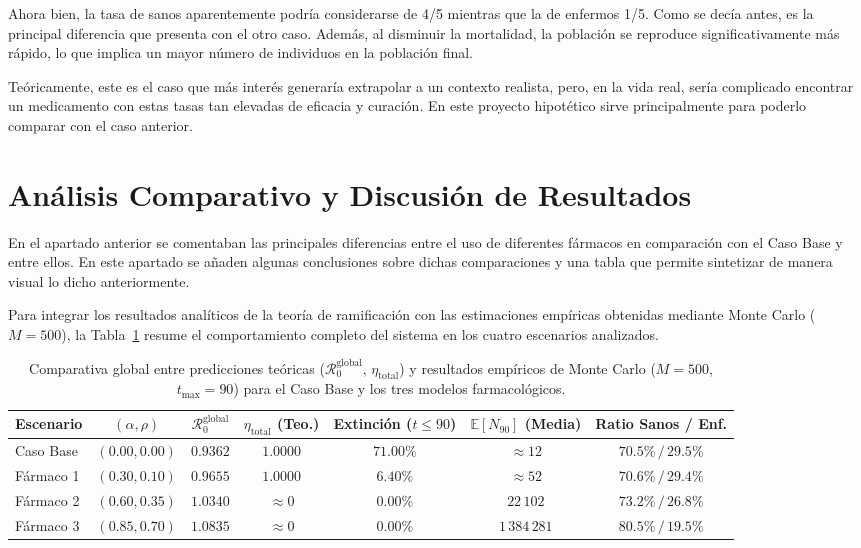 \documentclass[graybox]{SNmult}
\begin{document}
	Ahora bien, la tasa de sanos aparentemente podría considerarse de 4/5 mientras que la de enfermos 1/5. Como se decía antes, es la principal diferencia que presenta con el otro caso. Además, al disminuir la mortalidad, la población se reproduce significativamente más rápido, lo que implica un mayor número de individuos en la población final. 
	
	Teóricamente, este es el caso que más interés generaría extrapolar a un contexto realista, pero, en la vida real, sería complicado encontrar un medicamento con estas tasas tan elevadas de eficacia y curación. En este proyecto hipotético sirve principalmente para poderlo comparar con el caso anterior. 
	
	
	
	\section{Análisis Comparativo y Discusión de Resultados}
	\label{sec:discusion}
	En el apartado anterior se comentaban las principales diferencias entre el uso de diferentes fármacos en comparación con el Caso Base y entre ellos. En este apartado se añaden algunas conclusiones sobre dichas comparaciones y una tabla que permite sintetizar de manera visual lo dicho anteriormente. 
	
	
	Para integrar los resultados analíticos de la teoría de ramificación con las estimaciones empíricas obtenidas mediante Monte Carlo ($M=500$), la Tabla~\ref{tab:comparativa_global_final} resume el comportamiento completo del sistema en los cuatro escenarios analizados.
	
	\begin{table}[htbp]
		\caption{Comparativa global entre predicciones teóricas ($\mathcal{R}_0^{\text{global}}$, $\eta_{\text{total}}$) y resultados empíricos de Monte Carlo ($M=500$, $t_{\max}=90$) para el Caso Base y los tres modelos farmacológicos.}
		\label{tab:comparativa_global_final}
		\centering
		\begin{tabular}{lcccccc}
			\hline
			\textbf{Escenario} & $(\alpha, \rho)$ & $\mathcal{R}_0^{\text{global}}$ & $\eta_{\text{total}}$ \textbf{(Teo.)} & \textbf{Extinción ($t \le 90$)} & $\mathbb{E}[N_{90}]$ \textbf{(Media)} & \textbf{Ratio Sanos / Enf.} \\
			\hline
			Caso Base & $(0.00, 0.00)$ & $0.9362$ & $1.0000$ & $71.00\%$ & $\approx 12$ & $70.5\% \, / \, 29.5\%$ \\
			Fármaco 1 & $(0.30, 0.10)$ & $0.9655$ & $1.0000$ & $6.40\%$ & $\approx 52$ & $70.6\% \, / \, 29.4\%$ \\
			Fármaco 2 & $(0.60, 0.35)$ & $1.0340$ & $\approx 0$ & $0.00\%$ & $22\,102$ & $73.2\% \, / \, 26.8\%$ \\
			Fármaco 3 & $(0.85, 0.70)$ & $1.0835$ & $\approx 0$ & $0.00\%$ & $1\,384\,281$ & $80.5\% \, / \, 19.5\%$ \\
			\hline
		\end{tabular}
	\end{table}
	
\end{document}
